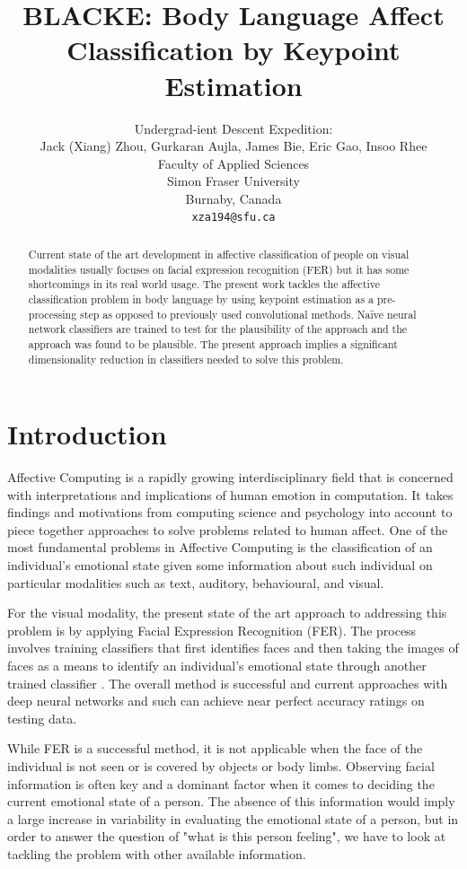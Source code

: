 \documentclass{article}
\title{BLACKE: Body Language Affect Classification by Keypoint Estimation}
\author{
  Undergrad-ient Descent Expedition: \\
  Jack (Xiang) Zhou, Gurkaran Aujla, James Bie, Eric Gao, Insoo Rhee\\
  Faculty of Applied Sciences\\
  Simon Fraser University\\
  Burnaby, Canada\\
  \texttt{xza194@sfu.ca} \\
}
\begin{document}
\maketitle

\begin{abstract}
Current state of the art development in affective classification of people on visual modalities usually focuses on facial expression recognition (FER) but it has some shortcomings in its real world usage. The present work tackles the affective classification problem in body language by using keypoint estimation as a pre-processing step as opposed to previously used convolutional methods. Na\"ive neural network classifiers are trained to test for the plausibility of the approach and the approach was found to be plausible. The present approach implies a significant dimensionality reduction in classifiers needed to solve this problem.
\end{abstract}

\section{Introduction}

Affective Computing is a rapidly growing interdisciplinary field that is concerned with interpretations and implications of human emotion in computation. It takes findings and motivations from computing science and psychology into account to piece together approaches to solve problems related to human affect. One of the most fundamental problems in Affective Computing is the classification of an individual's emotional state given some information about such individual on particular modalities such as text, auditory, behavioural, and visual.

For the visual modality, the present state of the art approach to addressing this problem is by applying Facial Expression Recognition (FER). The process involves training classifiers that first identifies faces and then taking the images of faces as a means to identify an individual's emotional state through another trained classifier \citep{li2018deep}. The overall method is successful and current approaches with deep neural networks and such can achieve near perfect accuracy ratings on testing data. 

While FER is a successful method, it is not applicable when the face of the individual is not seen or is covered by objects or body limbs. Observing facial information is often key and a dominant factor when it comes to deciding the current emotional state of a person. The absence of this information would imply a large increase in variability in evaluating the emotional state of a person, but in order to answer the question of "what is this person feeling", we have to look at tackling the problem with other available information.
\end{document}
